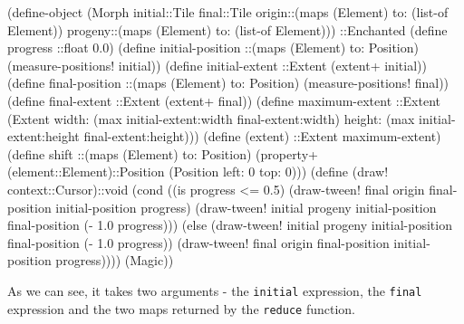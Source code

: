 \documentclass[acmsmall]{acmart}
\newenvironment{Snippet}{\Verbatim[samepage=true]}{\endVerbatim}
\begin{document}
\begin{Snippet}
(define-object (Morph initial::Tile final::Tile
		      origin::(maps (Element) to: (list-of Element))
		      progeny::(maps (Element) to: (list-of Element)))
  ::Enchanted
\end{Snippet}
\begin{Snippet}
  (define progress ::float 0.0)
\end{Snippet}
\begin{Snippet}
  (define initial-position ::(maps (Element) to: Position)
    (measure-positions! initial))
\end{Snippet}
\begin{Snippet}
  (define initial-extent ::Extent
    (extent+ initial))
\end{Snippet}
\begin{Snippet}
  (define final-position ::(maps (Element) to: Position)
    (measure-positions! final))
\end{Snippet}
\begin{Snippet}
  (define final-extent ::Extent
    (extent+ final))
\end{Snippet}
\begin{Snippet}
  (define maximum-extent ::Extent
    (Extent width: (max initial-extent:width final-extent:width)
	    height: (max initial-extent:height final-extent:height)))
\end{Snippet}
\begin{Snippet}
  (define (extent) ::Extent maximum-extent)
\end{Snippet}
\begin{Snippet}
  (define shift ::(maps (Element) to: Position)
    (property+ (element::Element)::Position
	       (Position left: 0 top: 0)))
\end{Snippet}
\begin{Snippet}
  (define (draw! context::Cursor)::void
    (cond ((is progress <= 0.5) 
 	   (draw-tween! final origin final-position initial-position progress)
           (draw-tween! initial progeny initial-position final-position 
                        (- 1.0 progress)))
	  (else
           (draw-tween! initial progeny initial-position final-position 
                        (- 1.0 progress))
           (draw-tween! final origin final-position initial-position progress))))
  (Magic))
\end{Snippet}

As we can see, it takes two arguments - the \texttt{initial}
expression, the \texttt{final} expression and the two maps returned by
the \texttt{reduce} function.
\end{document}
